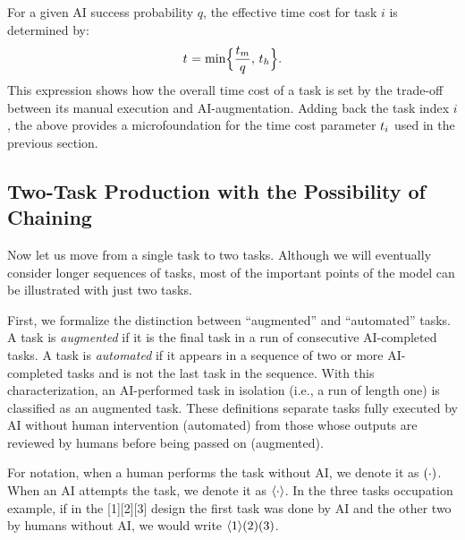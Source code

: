 \documentclass{article}
\theoremstyle{plain}
\theoremstyle{plain}
\begin{document}
For a given AI success probability $q$, the effective time cost for task $i$ is determined by:
$$t_{} = \min \Bigl\{\frac{t_{m}}{q},\, t_{h}\Bigr\}.$$
This expression shows how the overall time cost of a task is set by the trade-off between its manual execution and AI-augmentation.
Adding back the task index $i$, the above provides a microfoundation for the time cost parameter $t_{i}$ used in the previous section.



\subsection{Two-Task Production with the Possibility of Chaining}
Now let us move from a single task to two tasks.
Although we will eventually consider longer sequences of tasks, most of the important points of the model can be illustrated with just two tasks.

First, we formalize the distinction between ``augmented'' and ``automated'' tasks.  
A task is \emph{augmented} if it is the final task in a run of consecutive AI-completed tasks.  
A task is \emph{automated} if it appears in a sequence of two or more AI-completed tasks and is not the last task in the sequence.
With this characterization, an AI-performed task in isolation (i.e., a run of length one) is classified as an augmented task.
These definitions separate tasks fully executed by AI without human intervention (automated) from those whose outputs are reviewed by humans before being passed on (augmented).

For notation, when a human performs the task without AI, we denote it as $( \cdot )$.
When an AI attempts the task, we denote it as $\langle \cdot \rangle$.
In the three tasks occupation example, if in the [1][2][3] design the first task was done by AI and the other two by humans without AI, we would write $\langle 1 \rangle( 2 )( 3 )$.
\end{document}
